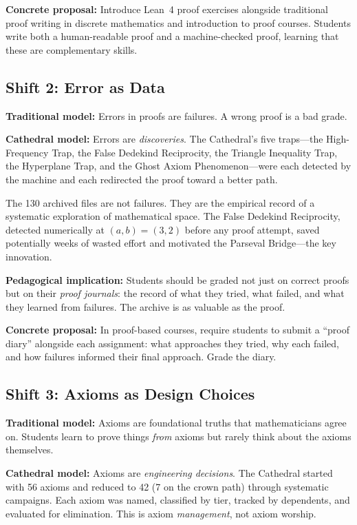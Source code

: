 \documentclass[11pt,a4paper]{article}
\begin{document}
\textbf{Concrete proposal:} Introduce Lean~4 proof exercises alongside
traditional proof writing in discrete mathematics and introduction
to proof courses. Students write both a human-readable proof and a
machine-checked proof, learning that these are complementary skills.

\subsection{Shift 2: Error as Data}

\textbf{Traditional model:} Errors in proofs are failures. A wrong
proof is a bad grade.

\textbf{Cathedral model:} Errors are \emph{discoveries}. The
Cathedral's five traps---the High-Frequency Trap, the False Dedekind
Reciprocity, the Triangle Inequality Trap, the Hyperplane Trap, and
the Ghost Axiom Phenomenon---were each detected by the machine and
each redirected the proof toward a better path.

The 130 archived files are not failures. They are the empirical record
of a systematic exploration of mathematical space. The False Dedekind
Reciprocity, detected numerically at $(a,b) = (3,2)$ before any proof
attempt, saved potentially weeks of wasted effort and motivated the
Parseval Bridge---the key innovation.

\textbf{Pedagogical implication:} Students should be graded not just
on correct proofs but on their \emph{proof journals}: the record of
what they tried, what failed, and what they learned from failures.
The archive is as valuable as the proof.

\textbf{Concrete proposal:} In proof-based courses, require students
to submit a ``proof diary'' alongside each assignment: what approaches
they tried, why each failed, and how failures informed their
final approach. Grade the diary.

\subsection{Shift 3: Axioms as Design Choices}

\textbf{Traditional model:} Axioms are foundational truths that
mathematicians agree on. Students learn to prove things \emph{from}
axioms but rarely think about the axioms themselves.

\textbf{Cathedral model:} Axioms are \emph{engineering decisions}.
The Cathedral started with 56 axioms and reduced to 42 (7 on the
crown path) through systematic campaigns. Each axiom was named,
classified by tier, tracked by dependents, and evaluated for
elimination. This is axiom \emph{management}, not axiom worship.
\end{document}
